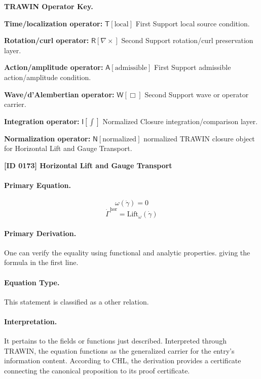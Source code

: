 \par\vspace{0.45\baselineskip}
\noindent\begin{minipage}[t]{\linewidth}
\begingroup
\small
\raggedright
\textbf{TRAWIN Operator Key.}\par
\noindent\textbf{Time/localization operator:} $\mathsf{T}\!\left[\mathrm{local}\right]$ First Support local source condition.\par
\noindent\textbf{Rotation/curl operator:} $\mathsf{R}\!\left[\nabla\times\right]$ Second Support rotation/curl preservation layer.\par
\noindent\textbf{Action/amplitude operator:} $\mathsf{A}\!\left[\mathrm{admissible}\right]$ First Support admissible action/amplitude condition.\par
\noindent\textbf{Wave/d'Alembertian operator:} $\mathsf{W}\!\left[\Box\right]$ Second Support wave or operator carrier.\par
\noindent\textbf{Integration operator:} $\mathsf{I}\!\left[\int\right]$ Normalized Closure integration/comparison layer.\par
\noindent\textbf{Normalization operator:} $\mathsf{N}\!\left[\mathrm{normalized}\right]$ normalized TRAWIN closure object for Horizontal Lift and Gauge Transport.\par
\endgroup
\end{minipage}

\clearpage
\noindent\textbf{[ID 0173] Horizontal Lift and Gauge Transport}\par
\vspace{0.35em}
\paragraph{Primary Equation.}
\[
\omega(\dot\gamma)=0
\]
\[
\dot\Gamma^{\mathrm{hor}} = \mathrm{Lift}_{\omega}(\dot\gamma)
\]

\paragraph{Primary Derivation.}
One can verify the equality using functional and analytic properties. giving the formula in the first line.
\paragraph{Equation Type.}
This statement is classified as a other relation.

\paragraph{Interpretation.}
It pertains to the fields or functions just described. Interpreted through TRAWIN, the equation functions as the generalized carrier for the entry’s information content. According to CHL, the derivation provides a certificate connecting the canonical proposition to its proof certificate.

